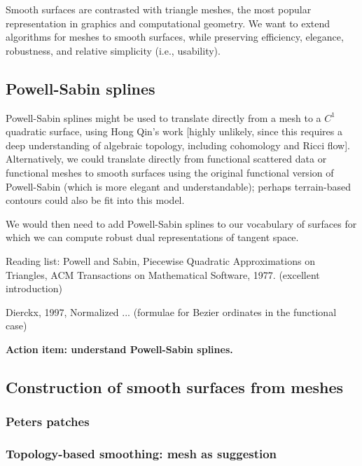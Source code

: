 \documentclass[11pt]{article}
\begin{document}
Smooth surfaces are contrasted with triangle meshes, the most popular representation in graphics 
and computational geometry.
We want to extend algorithms for meshes to smooth surfaces, while preserving efficiency,
elegance, robustness, and relative simplicity (i.e., usability).


\subsection{Powell-Sabin splines}

Powell-Sabin splines might be used to translate directly from a mesh to a $C^1$ quadratic surface,
using Hong Qin's work [highly unlikely, since this requires a deep understanding of algebraic
topology, including cohomology and Ricci flow].
Alternatively, we could translate directly from functional scattered data or functional meshes
to smooth surfaces using the original functional version of Powell-Sabin (which is more elegant
and understandable); perhaps terrain-based contours could also be fit into this model.

We would then need to add Powell-Sabin splines to our vocabulary of surfaces
for which we can compute robust dual representations of tangent space.

Reading list: Powell and Sabin, Piecewise Quadratic Approximations on Triangles, 
ACM Transactions on Mathematical Software, 1977.  (excellent introduction)

Dierckx, 1997, Normalized ... (formulae for Bezier ordinates in the functional case)

{\bf Action item: understand Powell-Sabin splines.}


\subsection{Construction of smooth surfaces from meshes}

\subsubsection{Peters patches}


\subsubsection{Topology-based smoothing: mesh as suggestion}
\end{document}
